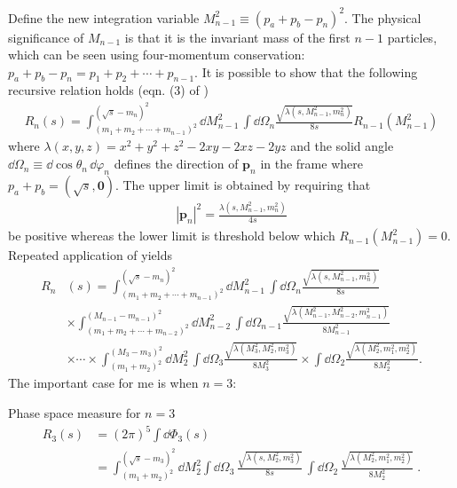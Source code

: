 Define the new integration variable $M_{n-1}^2 \equiv (p_a + p_b - p_n)^2$. The physical significance of $M_{n-1}$ is that it is the invariant mass of the first $n-1$ particles, which can be seen using four-momentum conservation: $p_a + p_b - p_n = p_1 + p_2 + \cdots + p_{n-1}$.
It is possible to show that the following recursive relation holds (eqn. (3) of \cite{Byckling:1969sx})
\begin{align}
    \label{eq:recursive-phase-space-relation}
    R_n(s) = 
    \int_{(m_1 + m_2 + \cdots + m_{n-1})^2}^{(\sqrt{s} - m_n)^2} 
    \dd M^2_{n-1} \, \int \dd \Omega_n
    \frac{\sqrt{\lambda(s, M_{n-1}^2, m_n^2)}}{8s} R_{n-1}(M_{n-1}^2)
\end{align}
where $\lambda(x, y, z) = x^2 + y^2 + z^2 - 2 xy - 2 xz - 2yz$ and the solid angle $\dd \Omega_n \equiv \dd \cos \theta_n\, \dd \varphi_n$ defines the direction of $\bm{p}_n$ in the frame where $p_a + p_b = (\sqrt{s}, \bm{0})$. 
The upper limit is obtained by requiring that 
\begin{align}
    |\bm{p}_n|^2 = \frac{\lambda(s, M_{n-1}^2, m_n^2)}{4 s}
\end{align}
be positive whereas the lower limit is threshold below which $R_{n-1}(M_{n-1}^2) = 0$.\footnotemark 
 Repeated application of  yields 
\begin{equation}
\begin{aligned}
    R_n&(s) 
        = 
    \int_{(m_1 + m_2 + \cdots + m_{n-1})^2}^{(\sqrt{s} - m_n)^2}
    \dd M^2_{n-1} \,  \int \dd \Omega_n
    \frac{\sqrt{\lambda(s, M_{n-1}^2, m_n^2)}}{8s} \\
        &\times 
    \int_{(m_1 + m_2 + \cdots + m_{n-2})^2}^{(M_{n-1} - m_{n-1})^2}
    \dd M^2_{n-2}  \, \int \dd \Omega_{n-1}
    \frac{\sqrt{\lambda(M_{n-1}^2, M_{n-2}^2, m_{n-1}^2)}}{8M_{n-1}^2} \\
        &\times \cdots \times
    \int_{(m_1 + m_2)^2}^{(M_3 - m_3)^2}
    \dd M^2_{2}  \, \int \dd \Omega_{3}
    \frac{\sqrt{\lambda(M_{3}^2, M_{2}^2, m_{3}^2)}}{8M_{3}^2} 
    \times 
    \int \dd \Omega_2
    \frac{\sqrt{\lambda(M_{2}^2, m_1^2, m_{2}^2)}}{8M_{2}^2}. 
\end{aligned}
\end{equation}
\newpage
The important case for me is when $n = 3$:
\begin{bluenv}{Phase space measure for $n = 3$}
    \vspace{-3ex}
    \begin{equation}
        \label{eq:recursive-LIPS-3}
    \begin{aligned}
        R_3(s) &= (2\pi)^{5}\int \dd \Phi_3(s) \\
            &= 
            \int_{(m_1 + m_2)^2}^{(\sqrt{s} - m_3)^2} \dd M_{2}^2 
            \int \dd \Omega_3 \,
            \frac{\sqrt{\lambda (s, M^2_{2}, m_3^2)}}{8s} \,
            \int \dd \Omega_2 \,
            \frac{\sqrt{\lambda (M^2_2, m_1^2, m_2^2)}}{8 M_2^2} \; .
    \end{aligned}
    \end{equation}
\end{bluenv}
